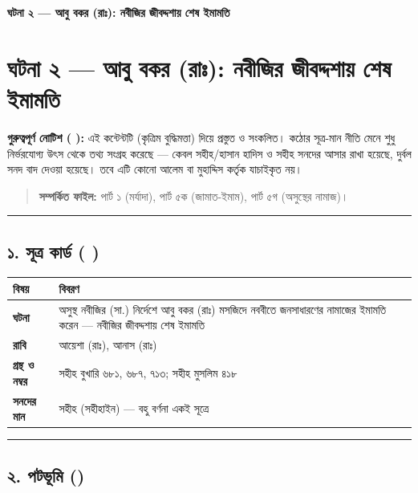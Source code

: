 

\begin{center}{\Large\bfseries\color{emerald} ঘটনা ২ — আবু বকর (রাঃ): নবীজির জীবদ্দশায় শেষ ইমামতি}\end{center}
\vspace{1em}
\section*{ঘটনা ২ — আবু বকর (রাঃ): নবীজির জীবদ্দশায় শেষ ইমামতি}

\begin{warnbox}
 \textbf{গুরুত্বপূর্ণ নোটিশ ( ):} এই কন্টেন্টটি  (কৃত্রিম বুদ্ধিমত্তা) দিয়ে প্রস্তুত ও সংকলিত।  কঠোর সূত্র-মান নীতি মেনে শুধু নির্ভরযোগ্য উৎস থেকে তথ্য সংগ্রহ করেছে — কেবল সহীহ/হাসান হাদিস ও সহীহ সনদের আসার রাখা হয়েছে, দুর্বল সনদ বাদ দেওয়া হয়েছে। তবে এটি কোনো আলেম বা মুহাদ্দিস কর্তৃক যাচাইকৃত নয়।
\end{warnbox}

\begin{quote}
\textbf{সম্পর্কিত ফাইল:} পার্ট ১ (মর্যাদা), পার্ট ৫ক (জামাত-ইমাম), পার্ট ৫গ (অসুস্থের নামাজ)।
\end{quote}

\medskip\hrule\medskip

\subsection*{১. সূত্র কার্ড ( )}

\begin{table}[h]\centering\small
\begin{tabular}{ll}
বিষয় & বিবরণ \\
\hline
\textbf{ঘটনা} & অসুস্থ নবীজির (সা.) নির্দেশে আবু বকর (রাঃ) মসজিদে নববীতে জনসাধারণের নামাজের ইমামতি করেন — নবীজির জীবদ্দশায় শেষ ইমামতি \\
\textbf{রাবি} & আয়েশা (রাঃ), আনাস (রাঃ) \\
\textbf{গ্রন্থ ও নম্বর} & সহীহ বুখারি ৬৮১, ৬৮৭, ৭১৩; সহীহ মুসলিম ৪১৮ \\
\textbf{সনদের মান} & সহীহ (সহীহাইন) — বহু বর্ণনা একই সূত্রে \\
\hline
\end{tabular}
\end{table}

\medskip\hrule\medskip

\subsection*{২. পটভূমি ()}

